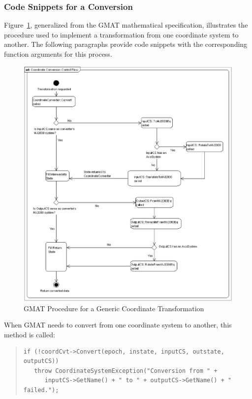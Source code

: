 \subsubsection{Code Snippets for a Conversion}

Figure~\ref{figure:TransformDetails}, generalized from the GMAT mathematical
specification, illustrates the procedure used to implement a transformation
from one coordinate system to another. The following paragraphs provide
code snippets with the corresponding function arguments for this process.

\begin{figure}
\begin{center}
\includegraphics[scale=0.5]{Images/CoordinateConversionControlFlow.eps}
\caption{\label{figure:TransformDetails}GMAT Procedure for a Generic Coordinate Transformation}
\end{center}
\end{figure}

When GMAT needs to convert from one coordinate system to another, this method is called:

\begin{quotation}
\begin{verbatim}
if (!coordCvt->Convert(epoch, instate, inputCS, outstate, outputCS))
   throw CoordinateSystemException("Conversion from " +
      inputCS->GetName() + " to " + outputCS->GetName() + " failed.");
\end{verbatim}
\end{quotation}

